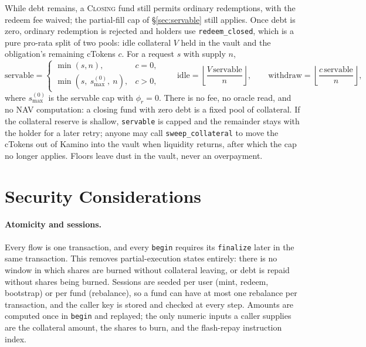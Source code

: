 \documentclass[11pt]{article}
\theoremstyle{remark}
\newcommand{\fl}[1]{\left\lfloor #1 \right\rfloor}
\begin{document}
While debt remains, a \textsc{Closing} fund still permits ordinary redemptions, with the redeem fee waived; the partial-fill cap of \S\ref{sec:servable} still applies. Once debt is zero, ordinary redemption is rejected and holders use \texttt{redeem\_closed}, which is a pure pro-rata split of two pools: idle collateral $V$ held in the vault and the obligation's remaining cTokens $c$. For a request $s$ with supply $n$,
\begin{equation}
\text{servable} =
\begin{cases}
\min(s, n), & c = 0,\\
\min(s,\ s^{(0)}_{\max},\ n), & c > 0,
\end{cases}
\qquad
\text{idle} = \fl{\frac{V\,\text{servable}}{n}},
\qquad
\text{withdraw} = \fl{\frac{c\,\text{servable}}{n}},
\label{eq:redeem-closed}
\end{equation}
where $s^{(0)}_{\max}$ is the servable cap with $\phi_r = 0$. There is no fee, no oracle read, and no NAV computation: a closing fund with zero debt is a fixed pool of collateral. If the collateral reserve is shallow, \texttt{servable} is capped and the remainder stays with the holder for a later retry; anyone may call \texttt{sweep\_collateral} to move the cTokens out of Kamino into the vault when liquidity returns, after which the cap no longer applies. Floors leave dust in the vault, never an overpayment.

\section{Security Considerations}
\label{sec:security}

\paragraph{Atomicity and sessions.}
Every flow is one transaction, and every \texttt{begin} requires its \texttt{finalize} later in the same transaction. This removes partial-execution states entirely: there is no window in which shares are burned without collateral leaving, or debt is repaid without shares being burned. Sessions are seeded per user (mint, redeem, bootstrap) or per fund (rebalance), so a fund can have at most one rebalance per transaction, and the caller key is stored and checked at every step. Amounts are computed once in \texttt{begin} and replayed; the only numeric inputs a caller supplies are the collateral amount, the shares to burn, and the flash-repay instruction index.
\end{document}
